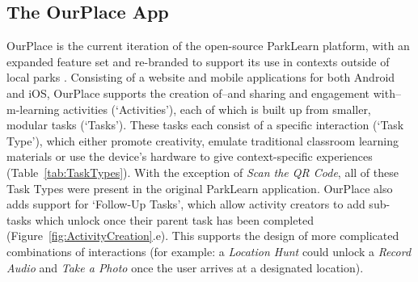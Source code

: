 \subsection{The OurPlace App}

OurPlace is the current iteration of the open-source ParkLearn platform, with an expanded feature set and re-branded to support its use in contexts outside of local parks \citep{Richardson2018a}. Consisting of a website and mobile applications for both Android and iOS, OurPlace supports the creation of--and sharing and engagement with--m-learning activities (`Activities'), each of which is built up from smaller, modular tasks (`Tasks'). These tasks each consist of a specific interaction (`Task Type'), which either promote creativity, emulate traditional classroom learning materials or use the device's hardware to give context-specific experiences (Table~\ref{tab:TaskTypes}). With the exception of \textit{Scan the QR Code}, all of these Task Types were present in the original ParkLearn application. OurPlace also adds support for `Follow-Up Tasks', which allow activity creators to add sub-tasks which unlock once their parent task has been completed (Figure~\ref{fig:ActivityCreation}.e). This supports the design of more complicated combinations of interactions (for example: a \textit{Location Hunt} could unlock a \textit{Record Audio} and \textit{Take a Photo} once the user arrives at a designated location).

